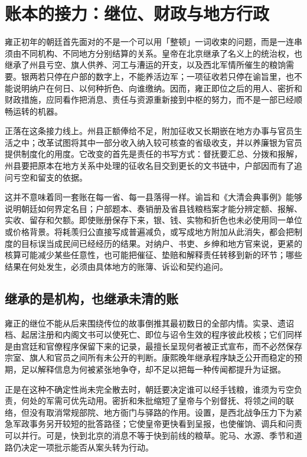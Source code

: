\section{账本的接力：继位、财政与地方行政}
\label{sec:high-qing-fiscal-order-succession}

雍正初年的朝廷首先面对的不是一个可以用「整顿」一词收束的问题，而是一连串须由不同机构、不同地方分别结算的关系。皇帝在北京继承了名义上的统治权，也继承了州县亏空、旗人供养、河工与漕运的开支，以及西北军情所催生的粮饷需要。银两若只停在户部的数字上，不能养活边军；一项征收若只停在谕旨里，也不能说明纳户在何日、以何种折色、向谁缴纳。因而，雍正即位之后的用人、密折和财政措施，应同看作把消息、责任与资源重新接到中枢的努力，而不是一部已经顺畅运转的机器。

正落在这条接力线上。州县正额俸给不足，附加征收又长期嵌在地方办事与官员生活之中；改革试图将其中一部分收入纳入较可核查的省级收支，并以养廉银为官员提供制度化的用度。它改变的首先是责任的书写方式：督抚要汇总、分拨和报解，州县要把原本在地方关系中处理的征收名目交到更长的文书链中，户部因而有了追问亏空和留支的依据。

这并不意味着同一套账在每一省、每一县落得一样。谕旨和《大清会典事例》能够说明朝廷如何界定名目；户部题本、奏销册及省县钱粮档案才能分辨定额、报解、实收、留存和欠额。即使账册保存下来，银、钱、实物和折色也未必使用同一单位或价格背景。将耗羡归公直接写成普遍减负，或写成地方附加从此消失，都会把制度的目标误当成民间已经经历的结果。对纳户、书吏、乡绅和地方官来说，更紧的核算可能减少某些任意性，也可能把催征、垫赔和解释责任转移到新的环节；哪些结果在何处发生，必须由具体地方的账簿、诉讼和契约追问。

\subsection{继承的是机构，也继承未清的账}

雍正的继位不能从后来围绕传位的故事倒推其最初数日的全部内情。实录、遗诏档、起居注册和内阁文书可以使死亡、即位与诏令生效的程序彼此校核；它们同样是由宫廷和官僚程序保留下来的记录，最擅长呈现何者被正式宣布，而不必然保存宗室、旗人和官员之间所有未公开的判断。康熙晚年继承程序缺乏公开而稳定的预期，足以解释信息为何被紧张地争夺，却不足以把每一种传闻都提升为证据。

正是在这种不确定性尚未完全散去时，朝廷要决定谁可以经手钱粮，谁须为亏空负责，何处的军需可优先动用。密折和朱批缩短了皇帝与个别督抚、将领之间的联络，但没有取消常规部院、地方衙门与驿路的作用。设置，是西北战争压力下为紧急军政事务另开较短的批答路径；它使皇帝更快看到呈报，也使催饷、调兵和问责可以并行。可是，快到北京的消息不等于快到前线的粮草。驼马、水源、季节和道路仍决定一项批示能否从案头转为行动。

